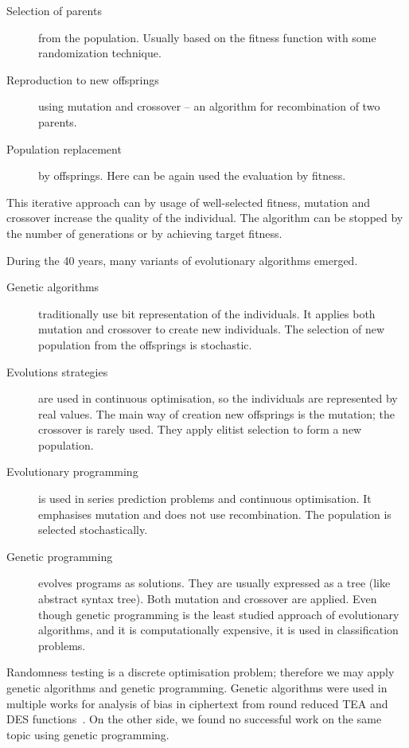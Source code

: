 \documentclass[
  print, %
  Table,   %
  nolof,     %
  nolot,     %
  11pt, %
  oneside  %
]{fithesis3}
\begin{document}
\begin{description}
    \item[Selection of parents] from the population. Usually based on the fitness function with some randomization technique.
    \item[Reproduction to new offsprings] using mutation and crossover -- an algorithm for recombination of two parents. 
    \item[Population replacement] by offsprings. Here can be again used the evaluation by fitness. 
\end{description}

This iterative approach can by usage of well-selected fitness, mutation and crossover increase the quality of the individual. The algorithm can be stopped by the number of generations or by achieving target fitness.

During the 40 years, many variants of evolutionary algorithms emerged.

\begin{description}
    \item[Genetic algorithms] traditionally use bit representation of the individuals. It applies both mutation and crossover to create new individuals. The selection of new population from the offsprings is stochastic.
    \item[Evolutions strategies] are used in continuous optimisation, so the individuals are represented by real values. The main way of creation new offsprings is the mutation; the crossover is rarely used. They apply elitist selection to form a new population.
    \item[Evolutionary programming] is used in series prediction problems and continuous optimisation. It emphasises mutation and does not use recombination. The population is selected stochastically.
    \item[Genetic programming] evolves programs as solutions. They are usually expressed as a tree (like abstract syntax tree). Both mutation and crossover are applied. Even though genetic programming is the least studied approach of evolutionary algorithms, and it is computationally expensive, it is used in classification problems.
\end{description}

Randomness testing is a discrete optimisation problem; therefore we may apply genetic algorithms and genetic programming. Genetic algorithms were used in multiple works for analysis of bias in ciphertext from round reduced TEA and DES functions~\cite{twoRoundsTea,fourRoundsTea,fiveRoundsTea,song2007cryptanalysis,husein2007genetic}. On the other side, we found no successful work on the same topic using genetic programming.
\end{document}
